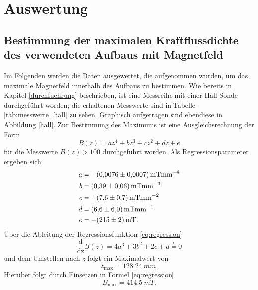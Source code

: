 \section{Auswertung}
\subsection{Bestimmung der maximalen Kraftflussdichte des verwendeten Aufbaus mit Magnetfeld}
Im Folgenden werden die Daten ausgewertet, die aufgenommen wurden, um das maximale Magnetfeld innerhalb des Aufbaus zu bestimmen. Wie bereits in Kapitel \ref{durchfuehrung} beschrieben, ist eine Messreihe mit einer Hall-Sonde durchgeführt worden; die erhaltenen Messwerte sind in Tabelle \ref{tab:messwerte_hall} zu sehen.
Graphisch aufgetragen sind ebendiese in Abbildung \ref{hall}. Zur Bestimmung des Maximums ist eine Ausgleichsrechnung der Form
\begin{equation}
B(z)=az^4+bz^3+cz^2+dz+e
\label{eq:regression}
\end{equation}
für die Messwerte $B(z)>100$ durchgeführt worden.
Als Regressionsparameter ergeben sich
\begin{align*}
  a&=-\SI{0,0076 \pm 0,0007}{mTmm^{-4}}\\
  b&=\SI{0,39 \pm 0,06}{mTmm^{-3}}\\
  c&=-\SI{7,6 \pm 0,7}{mTmm^{-2}}\\
  d&=\SI{6,6 \pm 6,0}{mTmm^{-1}}\\
  e&=-\SI{215 \pm 2}{mT}.
\end{align*}
Über die Ableitung der Regressionsfunktion \eqref{eq:regression}
\begin{equation}
\frac{\text{d}}{\text{dz}}B(z)=4a^3+3b^2+2c+d \stackrel{!}{=} 0
\end{equation}
und dem Umstellen nach $z$ folgt ein Maximalwert von
\begin{equation}
 z_\text{max}=\SI{128,24}{mm}.
\end{equation}
Hierüber folgt durch Einsetzen in Formel \eqref{eq:regression}
\begin{equation}
B_\text{max}=\SI{414,5}{mT}.
\end{equation}
